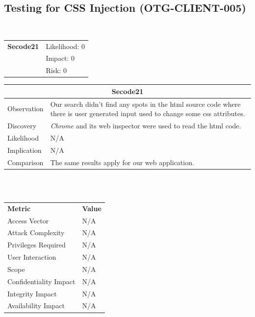 \documentclass[headsepline,footsepline,footinclude=false,oneside,fontsize=11pt,paper=a4,listof=totoc,bibliography=totoc]{scrbook} %
\begin{document}
\subsection{Testing for CSS Injection (OTG-CLIENT-005)}\
\begin{tabular}{cR{12cm}}
	\textbf{Secode21} & Likelihood: 0\\& Impact: 0\\& Risk: 0
\end{tabular}

\begin{tabular}{ l|p{11cm}  }
	\hline
	\multicolumn{2}{c}{\textbf{Secode21}} \\
	\hline
	Observation   & Our search didn't find any spots in the html source code where there is user generated input used to change some css attributes. \\
	Discovery  & \textit{Chrome} and its web inspector were used to read the html code. \\
	Likelihood & N/A \\
	Implication    & N/A \\
	Comparison & The same results apply for our web application. \\
	\hline
\end{tabular}
\\
\vspace{0.5cm}
\\
\begin{center}
	\begin{tabular}{ll}
		\rowcolor[HTML]{34CDF9}
		{\color[HTML]{ECF4FF} \textbf{Metric}}        & {\color[HTML]{ECF4FF} \textbf{Value}} \\
		\rowcolor[HTML]{BBDAFF}
		{\color[HTML]{333333} Access Vector}          & {\color[HTML]{333333} } N/A              \\
		\rowcolor[HTML]{ECF4FF}
		{\color[HTML]{333333} Attack Complexity}      & {\color[HTML]{333333} } N/A              \\
		\rowcolor[HTML]{BBDAFF}
		{\color[HTML]{333333} Privileges Required}    & {\color[HTML]{333333} } N/A              \\
		\rowcolor[HTML]{ECF4FF}
		{\color[HTML]{333333} User Interaction}       & {\color[HTML]{333333} } N/A              \\
		\rowcolor[HTML]{BBDAFF}
		{\color[HTML]{333333} Scope}                  & {\color[HTML]{333333} } N/A              \\
		\rowcolor[HTML]{ECF4FF}
		{\color[HTML]{333333} Confidentiality Impact} & {\color[HTML]{333333} } N/A              \\
		\rowcolor[HTML]{BBDAFF}
		{\color[HTML]{333333} Integrity Impact}       & {\color[HTML]{333333} } N/A              \\
		\rowcolor[HTML]{ECF4FF}
		{\color[HTML]{333333} Availability Impact}    & {\color[HTML]{333333} } N/A
	\end{tabular}
\end{center}
\pagebreak
\end{document}

